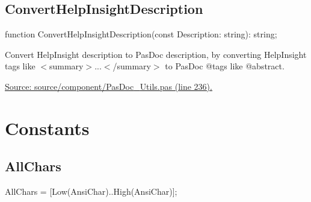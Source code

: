 \documentclass{report}
\newif\ifpdf
\begin{document}
\subsection*{ConvertHelpInsightDescription}
\fi
\label{PasDoc_Utils-ConvertHelpInsightDescription}
\begin{list}{}{
\setlength{\itemindent}{0cm}
\setlength{\listparindent}{0cm}
\setlength{\leftmargin}{\evensidemargin}
\addtolength{\leftmargin}{\tmplength}
\settowidth{\labelsep}{X}
\addtolength{\leftmargin}{\labelsep}
\setlength{\labelwidth}{\tmplength}
}
\item[\textbf{Declaration}\hfill]
\ifpdf
\begin{flushleft}
\fi
\begin{ttfamily}
function ConvertHelpInsightDescription(const Description: string): string;\end{ttfamily}

\ifpdf
\end{flushleft}
\fi

\par
\item[\textbf{Description}]
Convert HelpInsight description to PasDoc description, by converting HelpInsight tags like {$<$}summary{$>$}...{$<$}/summary{$>$} to PasDoc @tags like @abstract.\par
\href{https://github.com/pasdoc/pasdoc/blob/master/source/component/PasDoc_Utils.pas#L236}{Source: source/component/PasDoc{\_}Utils.pas (line 236).}

\end{list}
\section{Constants}
\ifpdf
\subsection*{\large{\textbf{AllChars}}\normalsize\hspace{1ex}\hrulefill}
\else
\subsection*{AllChars}
\fi
\label{PasDoc_Utils-AllChars}
\begin{list}{}{
\setlength{\itemindent}{0cm}
\setlength{\listparindent}{0cm}
\setlength{\leftmargin}{\evensidemargin}
\addtolength{\leftmargin}{\tmplength}
\settowidth{\labelsep}{X}
\addtolength{\leftmargin}{\labelsep}
\setlength{\labelwidth}{\tmplength}
}
\item[\textbf{Declaration}\hfill]
\ifpdf
\begin{flushleft}
\fi
\begin{ttfamily}
AllChars = [Low(AnsiChar)..High(AnsiChar)];\end{ttfamily}

\ifpdf
\end{flushleft}
\fi

\end{list}
\ifpdf
\end{document}

